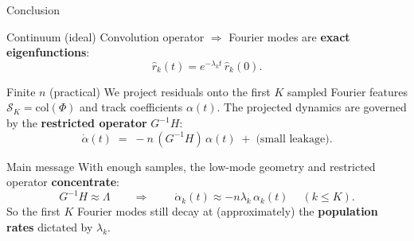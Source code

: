 \documentclass[10pt,aspectratio=169]{beamer}
\begin{document}
\begin{frame}{Conclusion}
	\small

	\begin{block}{Continuum (ideal)}
		Convolution operator $\Rightarrow$ Fourier modes are \textbf{exact eigenfunctions}:
		\[
			\hat r_k(t)=e^{-\lambda_k t}\,\hat r_k(0).
		\]
	\end{block}

	\begin{block}{Finite $n$ (practical)}
		We project residuals onto the first $K$ sampled Fourier features $\mathcal S_K=\mathrm{col}(\Phi)$ and track coefficients $\alpha(t)$.
		The projected dynamics are governed by the \textbf{restricted operator} $G^{-1}H$:
		\[
			\dot\alpha(t) \;=\; -n\,(G^{-1}H)\,\alpha(t)\;+\;\text{(small leakage)}.
		\]
	\end{block}

	\begin{block}{Main message}
		With enough samples, the low-mode geometry and restricted operator \textbf{concentrate}:
		\[
			G^{-1}H \approx \Lambda
			\qquad\Longrightarrow\qquad
			\boxed{\ \dot\alpha_k(t)\approx -n\lambda_k\,\alpha_k(t)\ } \quad (k\le K).
		\]
		So the first $K$ Fourier modes still decay at (approximately) the \textbf{population rates} dictated by $\lambda_k$.
	\end{block}

\end{frame}
\end{document}
